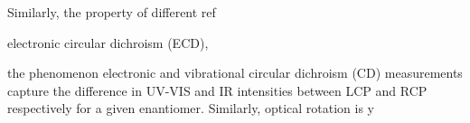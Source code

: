 Similarly, the property of different ref


electronic circular dichroism
(ECD), 


the phenomenon electronic and vibrational circular dichroism (CD) measurements 
capture the difference in UV-VIS and IR intensities between LCP and RCP respectively
for a given enantiomer. Similarly, optical rotation is y

 




